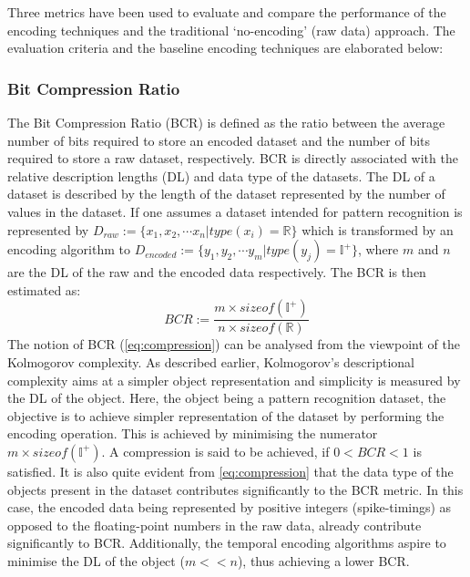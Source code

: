 Three metrics have been used to evaluate and compare the performance of the encoding techniques and the traditional `no-encoding' (raw data) approach. The evaluation criteria and the baseline encoding techniques are elaborated below:

\subsubsection{Bit Compression Ratio} 
The Bit Compression Ratio (BCR) is defined as the ratio between the average number of bits required to store an encoded dataset and the number of bits required to store a raw dataset, respectively. BCR is directly associated with the relative description lengths (DL) and data type of the datasets. The DL of a dataset is described by the length of the dataset represented by the number of values in the dataset. If one assumes a dataset intended for pattern recognition is represented by $D_{raw}:=\{x_1, x_2, \cdots x_n| type(x_i)=\mathbb{R}\}$ which is transformed by an encoding algorithm to $D_{encoded}:=\{y_1, y_2, \cdots y_m| type(y_j)=\mathbb{I}^+\}$, where $m$ and $n$ are the DL of the raw and the encoded data respectively. The BCR is then estimated as:
\begin{equation}
	BCR:=\frac{m\times sizeof(\mathbb{I}^+)}{n\times sizeof(\mathbb{R})}
\label{eq:compression}
\end{equation}  
The notion of BCR (\equationname \ref{eq:compression}) can be analysed from the viewpoint of the Kolmogorov complexity. As described earlier, Kolmogorov's descriptional complexity aims at a simpler object representation and simplicity is measured by the DL of the object. Here, the object being a pattern recognition dataset, the objective is to achieve simpler representation of the dataset by performing the encoding operation. This is achieved by minimising the numerator $m\times sizeof(\mathbb{I}^+)$. A compression is said to be achieved, if $0<BCR<1$ is satisfied. It is also quite evident from \equationname \ref{eq:compression} that the data type of the objects present in the dataset contributes significantly to the BCR metric. In this case, the encoded data being represented by positive integers (spike-timings) as opposed to the floating-point numbers in the raw data, already contribute significantly to BCR. Additionally, the temporal encoding algorithms aspire to minimise the DL of the object ($m<<n$), thus achieving a lower BCR.            
	
